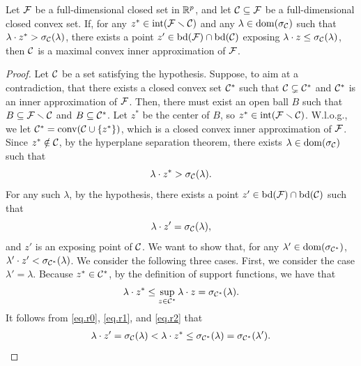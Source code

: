 \begin{theorem}\label{prop.max}
	Let \(\mathcal F\) be a full-dimensional closed set in \(\mathbb R^p\), and let \(\mathcal C  \subseteq  \mathcal F\) be a full-dimensional closed convex set. If, for any \(z^\ast \in \operatorname{int}(\mathcal F \smallsetminus \mathcal C)\) and any  $\lambda \in \operatorname{dom}(\sigma_{\mathcal C})$ such that $\lambda \cdot z^\ast > \sigma_{\mathcal C}(\lambda)$, there exists a point $z' \in \operatorname{bd}(\mathcal F) \cap \operatorname{bd}(\mathcal C)$ exposing $\lambda \cdot z \le \sigma_{\mathcal C}(\lambda)$, then $\mathcal C$ is a maximal convex inner approximation of $\mathcal F$.
	\end{theorem}
	\begin{proof}
 Let $\mathcal C$ be a set satisfying the hypothesis.  Suppose, to aim at a contradiction, that there exists a closed convex set $\mathcal C^\ast$ such that $\mathcal C \subsetneq \mathcal C^\ast$  and $\mathcal C^\ast$ is an inner approximation of $\mathcal F$. Then, there must exist  an open ball $B$ such that  \( B \subseteq \mathcal F \smallsetminus\mathcal C\) and $B \subseteq  \mathcal C^\ast$. Let $z^\ast$ be the center of $B$, so   $z^\ast \in  \operatorname{int}(\mathcal F \smallsetminus \mathcal C)$. W.l.o.g., we let $\mathcal C^\ast = \operatorname{conv}(\mathcal C \cup \{z^\ast\})$, which is a closed convex inner approximation of $\mathcal F$. Since $z^\ast \notin \mathcal C$, by the hyperplane separation theorem, there exists  \({\lambda} \in \operatorname{dom}(\sigma_{\mathcal C})\) such that
	\begin{equation}
    	\label{eq.r0}
	{\lambda}\cdot z^\ast > \sigma_{\mathcal C}({\lambda}).
	\end{equation}
	For any such $\lambda$, by the hypothesis, there exists a point \(z' \in \operatorname{bd}(\mathcal F) \cap \operatorname{bd}(\mathcal C)\) such that
	\begin{equation}
	\label{eq.r1}
  	{\lambda} \cdot z'  = \sigma_{\mathcal C}({\lambda}),  
	\end{equation}
	and $z'$ is an exposing point of $\mathcal C$. We want to show that,  for any \({\lambda'} \in \operatorname{dom}(\sigma_{\mathcal C^\ast})\), \({\lambda'}\cdot z' < 	\sigma_{\mathcal C^\ast}({\lambda})\). We consider the following three cases. First, we consider the case $\lambda'=\lambda$.  Because \(z^\ast \in \mathcal C^\ast\), by the definition of support functions, we have that
 	\begin{equation}
     	\label{eq.r2}
     	{\lambda} \cdot z^\ast \le \sup_{z \in \mathcal C^\ast}{\lambda}\cdot z = \sigma_{\mathcal C^\ast}({\lambda}).
 	\end{equation}
	It follows from \eqref{eq.r0}, \eqref{eq.r1}, and \eqref{eq.r2} that
	\begin{align}
	\label{eq.r4}
    	{\lambda} \cdot z'  =  \sigma_{\cC}({\lambda}) < {\lambda} \cdot z^\ast \le \sigma_{\cC^\ast}({\lambda}) = \sigma_{\cC^\ast}({\lambda'}).

\end{align}
\end{proof}
